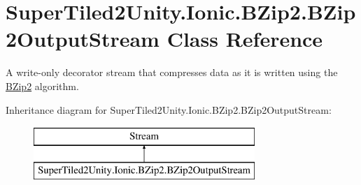 \hypertarget{class_super_tiled2_unity_1_1_ionic_1_1_b_zip2_1_1_b_zip2_output_stream}{}\section{Super\+Tiled2\+Unity.\+Ionic.\+B\+Zip2.\+B\+Zip2\+Output\+Stream Class Reference}
\label{class_super_tiled2_unity_1_1_ionic_1_1_b_zip2_1_1_b_zip2_output_stream}


A write-\/only decorator stream that compresses data as it is written using the \mbox{\hyperlink{namespace_super_tiled2_unity_1_1_ionic_1_1_b_zip2}{B\+Zip2}} algorithm.  


Inheritance diagram for Super\+Tiled2\+Unity.\+Ionic.\+B\+Zip2.\+B\+Zip2\+Output\+Stream\+:\begin{figure}[H]
\begin{center}
\leavevmode
\includegraphics[height=2.000000cm]{class_super_tiled2_unity_1_1_ionic_1_1_b_zip2_1_1_b_zip2_output_stream}
\end{center}
\end{figure}
